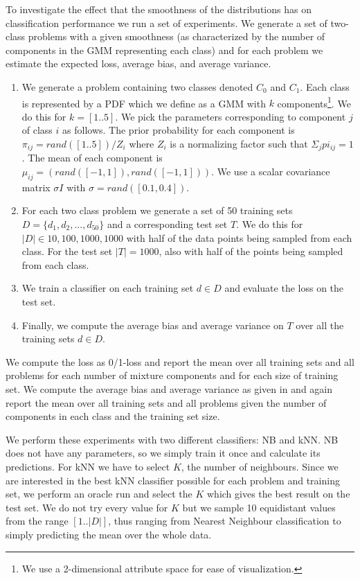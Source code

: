 \documentclass[a4paper]{article}
\begin{document}
To investigate the effect that the smoothness of the distributions has on classification performance we run a set of experiments. We generate a set of two-class problems with a given smoothness (as characterized by the number of components in the \ac{GMM} representing each class) and for each problem we estimate the expected loss, average bias, and average variance.

\begin{enumerate}
\item We generate a problem containing two classes denoted $C_0$ and $C_1$. Each class is represented by a \ac{PDF} which we define as a \ac{GMM} with $k$ components\footnote{We use a 2-dimensional attribute space for ease of visualization.}. We do this for $k = [1 .. 5]$. We pick the parameters corresponding to component $j$ of class $i$ as follows. The prior probability for each component is $\pi_{ij} = rand([1 .. 5]) / Z_i$ where $Z_i$ is a normalizing factor such that $\Sigma_{j} pi_{ij} = 1$. The mean of each component is $\mu_{ij} = (rand([-1,1]),rand([-1,1]))$. We use a scalar covariance matrix $\sigma I$ with $\sigma = rand([0.1,0.4])$.
\item For each two class problem we generate a set of 50 training sets $D = \{d_1, d_2, ..., d_{50}\}$ and a corresponding test set $T$. We do this for $|D| \in {10, 100, 1000, 1000}$ with half of the data points being sampled from each class. For the test set $|T| = 1000$, also with half of the points being sampled from each class.
\item We train a classifier on each training set $d \in D$ and evaluate the loss on the test set.
\item Finally, we compute the average bias and average variance on $T$ over all the training sets $d \in D$.
\end{enumerate}

We compute the loss as 0/1-loss and report the mean over all training sets and all problems for each number of mixture components and for each size of training set. We compute the average bias and average variance as given in \cite{Domingos2000} and again report the mean over all training sets and all problems given the number of components in each class and the training set size.

We perform these experiments with two different classifiers: \ac{NB} and \ac{kNN}. \ac{NB} does not have any parameters, so we simply train it once and calculate its predictions. For \ac{kNN} we have to select $K$, the number of neighbours. Since we are interested in the best \ac{kNN} classifier possible for each problem and training set, we perform an oracle run and select the $K$ which gives the best result on the test set. We do not try every value for $K$ but we sample 10 equidistant values from the range $[1 .. |D|]$, thus ranging from Nearest Neighbour classification to simply predicting the mean over the whole data.
\end{document}
